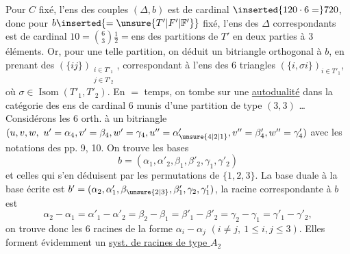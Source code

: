 Pour $C$ fixé, l'ens des couples $(\Delta,b)$ est de cardinal $\inserted{120\cdot6=}720$, donc pour $b\inserted{=\unsure{T'|F'|\mathbb F'}}$ fixé, l'ens des $\Delta$ correspondants est de cardinal $10=\binom63\frac12={}$ens des partitions  de $T'$ en deux parties à 3 éléments. Or, pour une telle partition, on déduit un bitriangle orthogonal à $b$, en prenant  des $(\{ij\})_{\substack{i\in T'_1\\j\in T'_2}}$, correspondant à l'ens  des 6 triangles $(\{i,\sigma i\})_{i\in T'_1}$, où $\sigma\in\operatorname{Isom}(T'_1,T'_2)$.
 En $=$ temps, on tombe sur une \uline{autodualité} dans la catégorie des ens de cardinal 6 munis d'une partition de type $(3,3)$ \ldots
Considérons les 6   orth. à un bitriangle $(u,v,w,\ u'=\alpha_4,v'=\beta_4,w'=\gamma_4,u''=\alpha'_{\unsure{4|2|1}},v''=\beta'_4,w''=\gamma'_4)$  avec les notations des pp. 9, 10. On trouve les bases 
\[
b=(\alpha_1,\alpha'_2,\beta_1,\beta'_2,\gamma_1,\gamma'_2)
\]
et celles qui s'en déduisent par les  permutations de $\{1,2,3\}$. La base duale à la base écrite est $b'=(\alpha_2,\alpha'_1,\beta_{\unsure{2|3}},\beta'_1,\gamma_2,\gamma'_1)$, la racine correspondante à $b$ est
\[
\alpha_2-\alpha_1=\alpha'_1-\alpha'_2=\beta_2-\beta_1=\beta'_1-\beta'_2=\gamma_2-\gamma_1=\gamma'_1-\gamma'_2,
\]
on trouve donc les 6 racines de la forme $\alpha_i-\alpha_j$ $(i\ne j,\ 1\le i,j\le3)$. Elles forment évidemment un \uline{syst. de racines de type $A_2$}

